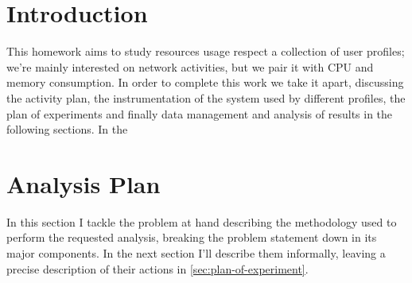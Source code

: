 \documentclass[10pt,a4paper]{article}
\begin{document}
    \title{\rmfamily\normalfont{}}
    \author{} \date{\today}
    
    \maketitle

    \begin{abstract}
      This short article collects the work I did in order to support
      my Quantitative Systems Analysis exam. The goal is to study
      resources usage respect a collection of user profiles, each of
      them catch a way of using some applications of interest in
      different time windows. I performed some experiments collecting
      results in a OLAP ``star''-like relational schema in order to
      provide summaries for dimensions under study, such as bandwidth
      usage, network activity, CPU and memory consumption.
    \end{abstract}
       
    \tableofcontents
   
    \section*{Introduction}

    This homework aims to study resources usage respect a collection
    of user profiles; we're mainly interested on network activities,
    but we pair it with CPU and memory consumption. In order to
    complete this work we take it apart, discussing the activity plan,
    the instrumentation of the system used by different profiles, the
    plan of experiments and finally data management and analysis of
    results in the following sections. In the 
 
    \newpage
    \section{Analysis Plan}
    In this section I tackle the problem at hand describing the
    methodology used to perform the requested analysis, breaking the
    problem statement down in its major components. In the next
    section I'll describe them informally, leaving a precise
    description of their actions in \autoref{sec:plan-of-experiment}.
\end{document}
